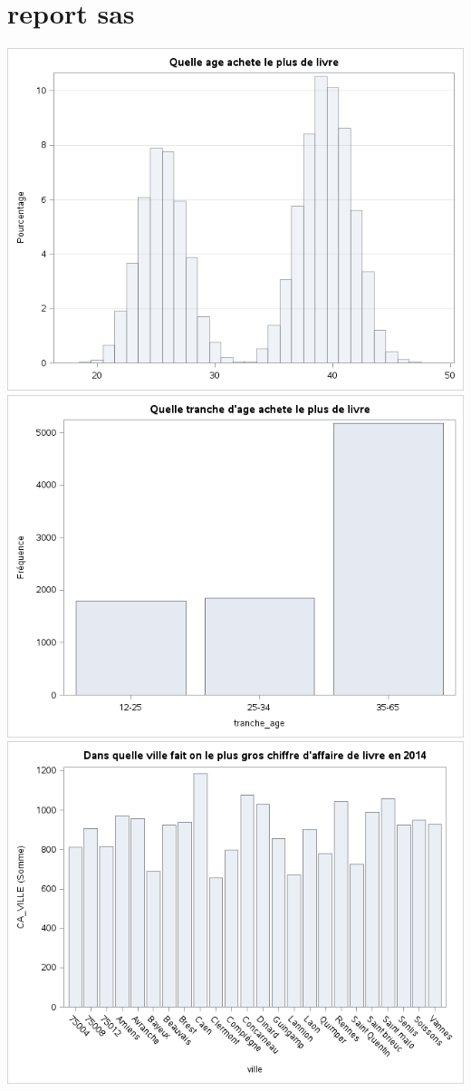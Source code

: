 \section{report sas}\label{reporting-results}
%
\includegraphics[scale=0.7]{./images/sas_report/age_vente_livre.png}
\includegraphics[scale=0.7]{./images/sas_report/tranche_age_livre.png}
\includegraphics[scale=0.7]{./images/sas_report/ville_2014.png}
